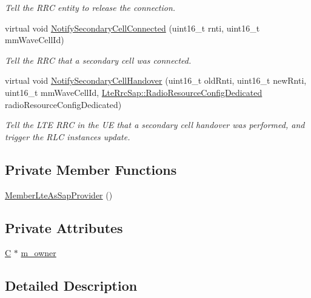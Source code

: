 \begin{DoxyCompactItemize}
\begin{DoxyCompactList}\small\item\em Tell the R\+RC entity to release the connection. \end{DoxyCompactList}\item 
virtual void \hyperlink{classns3_1_1MemberLteAsSapProvider_ad27758a57c5e2df44d45c8ff90dd868a}{Notify\+Secondary\+Cell\+Connected} (uint16\+\_\+t rnti, uint16\+\_\+t mm\+Wave\+Cell\+Id)
\begin{DoxyCompactList}\small\item\em Tell the R\+RC that a secondary cell was connected. \end{DoxyCompactList}\item 
virtual void \hyperlink{classns3_1_1MemberLteAsSapProvider_a0284353c0041c7dc6173d2166e783aa1}{Notify\+Secondary\+Cell\+Handover} (uint16\+\_\+t old\+Rnti, uint16\+\_\+t new\+Rnti, uint16\+\_\+t mm\+Wave\+Cell\+Id, \hyperlink{structns3_1_1LteRrcSap_1_1RadioResourceConfigDedicated}{Lte\+Rrc\+Sap\+::\+Radio\+Resource\+Config\+Dedicated} radio\+Resource\+Config\+Dedicated)
\begin{DoxyCompactList}\small\item\em Tell the L\+TE R\+RC in the UE that a secondary cell handover was performed, and trigger the R\+LC instances update. \end{DoxyCompactList}\end{DoxyCompactItemize}
\subsection*{Private Member Functions}
\begin{DoxyCompactItemize}
\item 
\hyperlink{classns3_1_1MemberLteAsSapProvider_a98b773800dda070ecca3c2cd6f065fb7}{Member\+Lte\+As\+Sap\+Provider} ()
\end{DoxyCompactItemize}
\subsection*{Private Attributes}
\begin{DoxyCompactItemize}
\item 
\hyperlink{loss__COST231__small__cities__urban_8m_aaa53ca0b650dfd85c4f59fa156f7a2cc}{C} $\ast$ \hyperlink{classns3_1_1MemberLteAsSapProvider_a96ffeef62638df36c2fbaa3fb9fabb57}{m\+\_\+owner}
\end{DoxyCompactItemize}


\subsection{Detailed Description}
